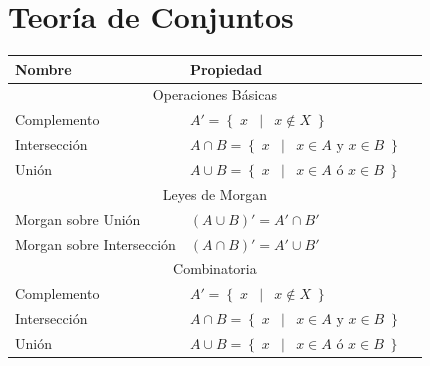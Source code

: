 \documentclass[12pt, fleqn]{report}                             %
\DeclareMathOperator \Space {\quad}                             %
\DeclareMathOperator \MiniSpace {\;}                            %
\newcommand \Such {\MiniSpace | \MiniSpace}                     %
\theoremstyle{break}                                            %
\newcommand{\Set}[1]{\left\{ \; #1 \; \right\}}                 %
\begin{document}
        \section{Teoría de Conjuntos}

            \begin{table}[ht]
                \begin{tabular}{|m{16em}|m{16em}|@{}m{0pt}@{}}
                    \hline
                    \large{Nombre}          & \large{Propiedad}                             &\\[2em]    \hline\hline

                    \multicolumn{3}{|c|}{Operaciones Básicas}                                \\         \hline
                    Complemento  & $A' = \Set{x \Such x \notin X}$                          &\\[1em]    \hline
                    Intersección & $A \cap B = \Set{x \Such x \in A \text{ y } x \in B}$    &\\[1em]    \hline
                    Unión        & $A \cup B = \Set{x \Such x \in A \text{ ó } x \in B}$    &\\[1em]    \hline\hline

                    \multicolumn{3}{|c|}{Leyes de Morgan}                                    \\         \hline
                    Morgan sobre Unión          & $(A \cup B)' = A' \cap B'$                &\\[1em]    \hline
                    Morgan sobre Intersección   & $(A \cap B)' = A' \cup B'$                &\\[1em]    \hline\hline

                    \multicolumn{3}{|c|}{Combinatoria}                                       \\         \hline
                    Complemento  & $A' = \Set{x \Such x \notin X}$                          &\\[1em]    \hline
                    Intersección & $A \cap B = \Set{x \Such x \in A \text{ y } x \in B}$    &\\[1em]    \hline
                    Unión        & $A \cup B = \Set{x \Such x \in A \text{ ó } x \in B}$    &\\[1em]    \hline\hline
                  
                \end{tabular}
            \end{table}
\end{document}
